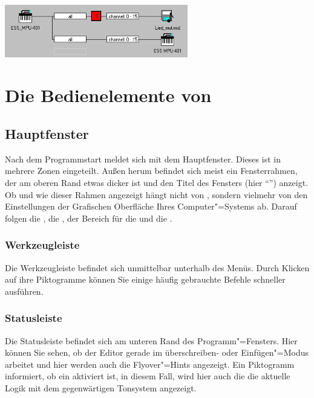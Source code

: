 \begin{center}
\ifhtml
{}
\else
\includegraphics[width=226.5pt]{cc_midioutpara}
\fi
\end{center}

\part{Die Bedienelemente von \mutabor}

\chapter{Hauptfenster}\label{sec:DE_MAINWINDOW}

Nach dem Programmstart meldet sich \mutabor{} mit dem Hauptfenster.
Dieses ist in mehrere Zonen eingeteilt. Außen herum befindet sich
meist ein Fensterrahmen, der am oberen Rand etwas dicker ist und den
Titel des Fensters (hier "`\mutabor"') anzeigt. Ob und wie dieser
Rahmen angezeigt hängt nicht von \mutabor{}, sondern vielmehr von den
Einstellungen der Grafischen Oberfläche Ihres Computer"=Systems ab.
Darauf folgen die , die
, der Bereich für die
 und die
.

\section{Werkzeugleiste}\label{sec:DE_TOOLBAR}
Die Werkzeugleiste befindet sich unmittelbar unterhalb des Menüs.
Durch Klicken auf ihre Piktogramme können Sie einige häufig gebrauchte
Befehle schneller ausführen.

\section{Statusleiste}\label{sec:DE_STATUS}
Die Statusleiste befindet sich am unteren Rand des Programm"=Fensters.
Hier können Sie sehen, ob der Editor gerade im überschreiben- oder
Einfügen"=Modus arbeitet und hier werden auch die Flyover"=Hints
angezeigt. Ein Piktogramm informiert, ob ein
 aktiviert ist, in diesem
Fall, wird hier auch die  die
aktuelle Logik mit dem gegenwärtigen Tonsystem angezeigt.


